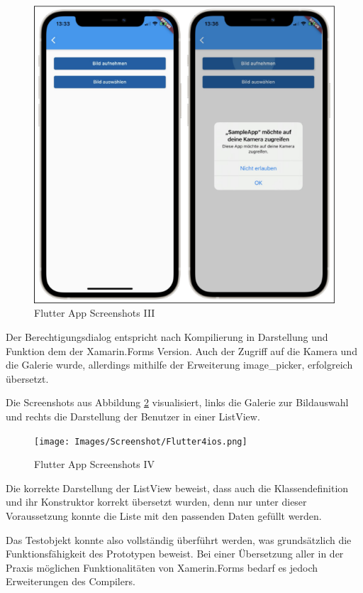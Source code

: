 \begin{figure}[!ht]
 \includegraphics[width=\textwidth,keepaspectratio]{Images/Screenshot/Flutter3ios.png}
 \caption{Flutter App Screenshots III}
 \label{fig:FlutterAppIII}
\end{figure}
Der Berechtigungsdialog entspricht nach Kompilierung in Darstellung und 
Funktion dem der Xamarin.Forms Version.  Auch der Zugriff auf die Kamera und die Galerie wurde, allerdings mithilfe der Erweiterung image\_picker, erfolgreich übersetzt.

Die Screenshots aus Abbildung \ref{fig:FlutterAppIV} visualisiert,  links die Galerie zur Bildauswahl und rechts die Darstellung der Benutzer in einer ListView.  


 \newpage 
\begin{figure}[!ht]
 \texttt{[image: Images/Screenshot/Flutter4ios.png]}
 \caption{Flutter App Screenshots IV}
 \label{fig:FlutterAppIV}
\end{figure}
Die korrekte Darstellung der ListView beweist, dass auch die Klassendefinition und ihr Konstruktor korrekt übersetzt wurden, denn nur unter dieser Voraussetzung konnte die Liste mit den  passenden Daten gefüllt werden.

Das Testobjekt konnte also vollständig überführt werden, was grundsätzlich die 
Funktionsfähigkeit des Prototypen beweist.  Bei einer Übersetzung aller in der Praxis möglichen 
Funktionalitäten von Xamerin.Forms bedarf es jedoch Erweiterungen des Compilers. 


